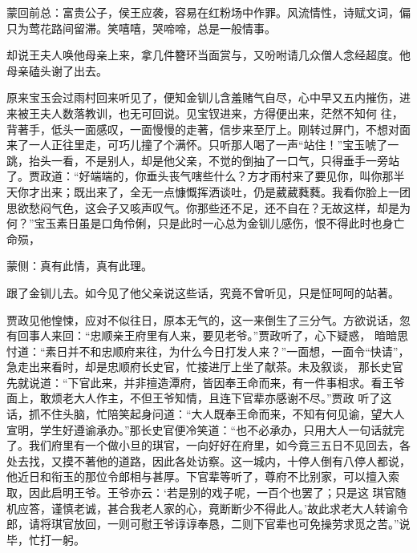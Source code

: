 \begin{parag}
    \begin{note}蒙回前总：富贵公子，侯王应袭，容易在红粉场中作罪。风流情性，诗赋文词，偏只为莺花路间留滞。笑嘻嘻，哭啼啼，总是一般情事。\end{note}
\end{parag}


\begin{parag}
    却说王夫人唤他母亲上来，拿几件簪环当面赏与，又吩咐请几众僧人念经超度。他母亲磕头谢了出去。
\end{parag}


\begin{parag}
    原来宝玉会过雨村回来听见了，便知金钏儿含羞赌气自尽，心中早又五内摧伤，进来被王夫人数落教训，也无可回说。见宝钗进来，方得便出来，茫然不知何 往，背著手，低头一面感叹，一面慢慢的走著，信步来至厅上。刚转过屏门，不想对面来了一人正往里走，可巧儿撞了个满怀。只听那人喝了一声“站住！”宝玉唬了一跳，抬头一看，不是别人，却是他父亲，不觉的倒抽了一口气，只得垂手一旁站了。贾政道：“好端端的，你垂头丧气嗐些什么？方才雨村来了要见你，叫你那半天你才出来；既出来了，全无一点慷慨挥洒谈吐，仍是葳葳蕤蕤。我看你脸上一团思欲愁闷气色，这会子又咳声叹气。你那些还不足，还不自在？无故这样，却是为何？”宝玉素日虽是口角伶俐，只是此时一心总为金钏儿感伤，恨不得此时也身亡命殒，\begin{note}蒙侧：真有此情，真有此理。\end{note}跟了金钏儿去。如今见了他父亲说这些话，究竟不曾听见，只是怔呵呵的站著。
\end{parag}


\begin{parag}
    贾政见他惶悚，应对不似往日，原本无气的，这一来倒生了三分气。方欲说话，忽有回事人来回：“忠顺亲王府里有人来，要见老爷。”贾政听了，心下疑惑， 暗暗思忖道：“素日并不和忠顺府来往，为什么今日打发人来？”一面想，一面令“快请”，急走出来看时，却是忠顺府长史官，忙接进厅上坐了献茶。未及叙谈， 那长史官先就说道：“下官此来，并非擅造潭府，皆因奉王命而来，有一件事相求。看王爷面上，敢烦老大人作主，不但王爷知情，且连下官辈亦感谢不尽。”贾政 听了这话，抓不住头脑，忙陪笑起身问道：“大人既奉王命而来，不知有何见谕，望大人宣明，学生好遵谕承办。”那长史官便冷笑道：“也不必承办，只用大人一句话就完了。我们府里有一个做小旦的琪官，一向好好在府里，如今竟三五日不见回去，各处去找，又摸不著他的道路，因此各处访察。这一城内，十停人倒有八停人都说，他近日和衔玉的那位令郎相与甚厚。下官辈等听了，尊府不比别家，可以擅入索取，因此启明王爷。王爷亦云：‘若是别的戏子呢，一百个也罢了；只是这 琪官随机应答，谨慎老诚，甚合我老人家的心，竟断断少不得此人。’故此求老大人转谕令郎，请将琪官放回，一则可慰王爷谆谆奉恳，二则下官辈也可免操劳求觅之苦。”说毕，忙打一躬。
\end{parag}


